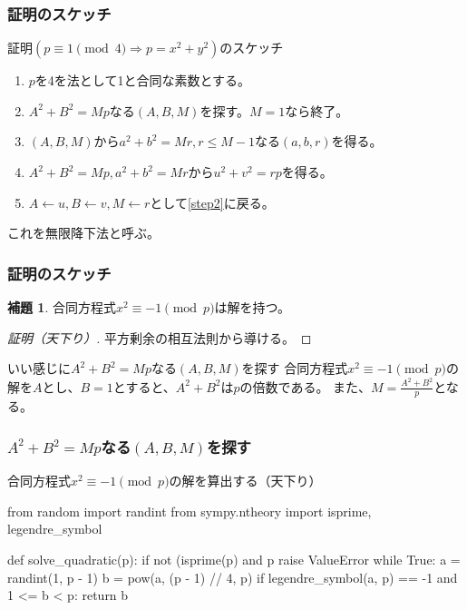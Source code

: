 \documentclass[dvipdfmx,11pt,notheorems]{beamer}
\theoremstyle{definition}
\newtheorem{lemma}{補題}
\begin{document}
\begin{frame}\frametitle{証明のスケッチ}

\begin{block}{証明$(p \equiv 1 \pmod{4} \Rightarrow p = x^{2} + y^{2})$のスケッチ}

\begin{enumerate}
\item $p$を4を法として1と合同な素数とする。
\item $A^{2}+B^{2} = Mp$なる$(A, B, M)$を探す。$M=1$なら終了。 \label{step2}
\item $(A, B, M)$から$a^{2}+b^{2}=Mr, r \leq M-1$なる$(a, b, r)$を得る。
\item $A^{2} + B^{2} = Mp, a^{2}+b^{2}=Mr$から$u^{2} + v^{2} = rp$を得る。
\item $A \leftarrow u, B \leftarrow v, M \leftarrow r$として\ref{step2}に戻る。
\end{enumerate}

\end{block}
これを無限降下法と呼ぶ。
\end{frame}

\begin{frame}\frametitle{証明のスケッチ}

\begin{lemma}
合同方程式$x^{2} \equiv -1 \pmod{p}$は解を持つ。
\end{lemma}

\begin{proof}[証明（天下り）]
平方剰余の相互法則から導ける。
\end{proof}

\begin{exampleblock}{いい感じに$A^{2}+B^{2} = Mp$なる$(A, B, M)$を探す}
合同方程式$x^{2} \equiv -1 \pmod{p}$の解を$A$とし、$B=1$とすると、$A^{2}+B^{2}$は$p$の倍数である。
また、$\displaystyle M=\frac{A^{2} + B^{2}}{p}$となる。
\end{exampleblock}

\end{frame}

\begin{frame}[fragile]\frametitle{$A^{2}+B^{2} = Mp$なる$(A, B, M)$を探す}

\begin{block}{合同方程式$x^{2} \equiv -1 \pmod{p}$の解を算出する（天下り）}
\begin{pyverbatim}
from random import randint
from sympy.ntheory import isprime, legendre_symbol


def solve_quadratic(p):
    if not (isprime(p) and p %
        raise ValueError
    while True:
        a = randint(1, p - 1)
        b = pow(a, (p - 1) // 4, p)
        if legendre_symbol(a, p) == -1 and 1 <= b < p:
            return b
\end{pyverbatim}
\end{block}

\end{frame}
\end{document}
